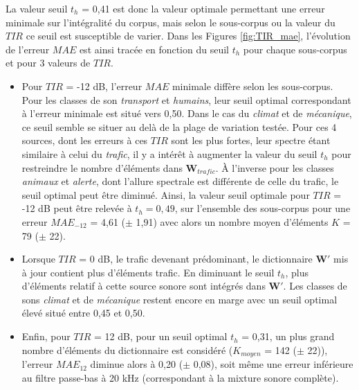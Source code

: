 La valeur seuil $t_h$ = 0,41 est donc la valeur optimale permettant une erreur minimale sur l'intégralité du corpus, mais selon le sous-corpus ou la valeur du $TIR$ ce seuil est susceptible de varier.
Dans les Figures \ref{fig:TIR_mae}, l'évolution de l'erreur $MAE$ est ainsi tracée en fonction du seuil $t_h$ pour chaque sous-corpus et pour 3 valeurs de $TIR$.
\begin{itemize}
\item Pour $TIR$ = -12 dB, l'erreur $MAE$ minimale diffère selon les sous-corpus.
Pour les classes de son \textit{transport} et \textit{humains}, leur seuil optimal correspondant à l'erreur minimale est situé vers 0,50. Dans le cas du \textit{climat} et de \textit{mécanique}, ce seuil semble se situer au delà de la plage de variation testée.  Pour ces 4 sources, dont les erreurs à ces $TIR$ sont les plus fortes, leur spectre étant similaire à celui du \textit{trafic}, il y a intérêt à augmenter la valeur du seuil $t_h$ pour restreindre le nombre d'éléments dans $\mathbf{W}_{trafic}$. À l'inverse pour  les classes \textit{animaux} et \textit{alerte}, dont l'allure spectrale est différente de celle du trafic, le seuil optimal peut être diminué.
Ainsi, la valeur seuil optimale pour $TIR$ = -12 dB peut être relevée à $t_h = 0,49$, sur l'ensemble des sous-corpus pour une erreur $MAE_{-12}$ = 4,61 ($\pm$ 1,91) avec alors un nombre moyen d'éléments $K$ = 79 ($\pm$ 22).
\item Lorsque $TIR$ = 0 dB, le trafic devenant prédominant, le dictionnaire $\mathbf{W'}$ mis à jour contient plus d'éléments trafic. En diminuant le seuil $t_h$, plus d'éléments relatif à cette source sonore sont intégrés dans $\mathbf{W'}$.
Les classes de sons \textit{climat} et de \textit{mécanique} restent encore en marge avec un seuil optimal élevé situé entre 0,45 et 0,50.
\item Enfin, pour $TIR$ = 12 dB, pour un seuil optimal $t_h$ = 0,31, un plus grand nombre d'éléments du dictionnaire est considéré ($K_{moyen}$ = 142 ($\pm$ 22)), l'erreur $MAE_{12}$ diminue alors à 0,20 ($\pm$ 0,08), soit même une erreur inférieure au filtre passe-bas à 20 kHz (correspondant à la mixture sonore complète).\\
\end{itemize}

